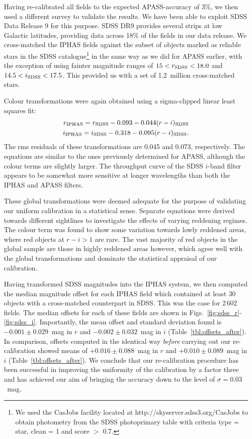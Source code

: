 \documentclass[useAMS,usenatbib]{mn2e}
\begin{document}
Having re-calibrated all fields to the expected APASS-accuracy of 3\%,
we then used a different survey to validate the results.
We have been able to exploit SDSS Data Release 9 \citep{Ahn2012}
for this purpose.
SDSS DR9 provides several strips at low
Galactic latitudes,
providing data across 18\% of the fields in our data release.
We cross-matched the IPHAS fields against the subset of
objects marked as reliable stars in the SDSS catalogue\footnote{
We used the CasJobs facility located at http://skyserver.sdss3.org/CasJobs
to obtain photometry from the SDSS {\sc photoprimary} table 
with criteria {\sc type = star}, {\sc clean = 1} and {\sc score $>$ 0.7}.}
in the same way as we did for APASS earlier,
with the exception of using fainter magnitude ranges of 
$15<r_{\rm SDSS}<18.0$ and $14.5<i_{\rm SDSS}<17.5$.
This provided us with a set of 1.2~million cross-matched stars.

Colour transformations were again obtained using a sigma-clipped linear least squares fit:
\begin{eqnarray}
r_{\rm IPHAS} = r_{\rm SDSS} - 0.093 - 0.044(r-i)_{\rm SDSS} \label{eqn:sdss_r} \\
i_{\rm IPHAS} = i_{\rm SDSS} - 0.318 - 0.095(r-i)_{\rm SDSS}. \label{eqn:sdss_i}
\end{eqnarray}
The rms residuals of these transformations are 0.045 and 0.073, respectively.
The equations are similar to the ones
previously determined for APASS,
although the colour terms are slightly larger.
The throughput curve of the SDSS $i$-band filter 
appears to be somewhat more sensitive at longer wavelengths
than both the IPHAS and APASS filters.

These global transformations were deemed adequate
for the purpose of validating our uniform calibration in a statistical sense.
Separate equations were derived towards different sightlines
to investigate the effects of varying reddening regimes.
The colour term was found 
to show some variation towards lowly reddened areas,
where red objects at $r-i > 1$ are rare.
The vast majority of red objects in the global sample
are those in highly reddened areas however,
which agree well with the global transformations
and dominate the statistical appraisal of our calibration.

Having transformed SDSS magnitudes into the IPHAS system,
we then computed the median magnitude offset for each IPHAS field
which contained at least 30 objects with a cross-matched counterpart
in SDSS.
This was the case for 2\,602 fields.
The median offsets for each of these fields
are shown in Figs.~\ref{fig:sdss_r}-\ref{fig:sdss_i}.
Importantly, the mean offset and standard deviation found 
is $-0.001\pm0.029$~mag in $r$
and $-0.002\pm0.032$~mag in $i$ (Table~\ref{tbl:offsets_after}).
In comparison, offsets computed in the identical way
\emph{before} carrying out our re-calibration showed means
of $+0.016\pm0.088$~mag in $r$ and $+0.010\pm0.089$~mag in $i$ (Table~\ref{tbl:offsets_after}).
We conclude that our re-calibration procedure has
been successful in improving the
uniformity of the calibration by a factor three
and has achieved our aim of bringing the
accuracy down to the level of $\sigma=0.03$~mag.
\end{document}
